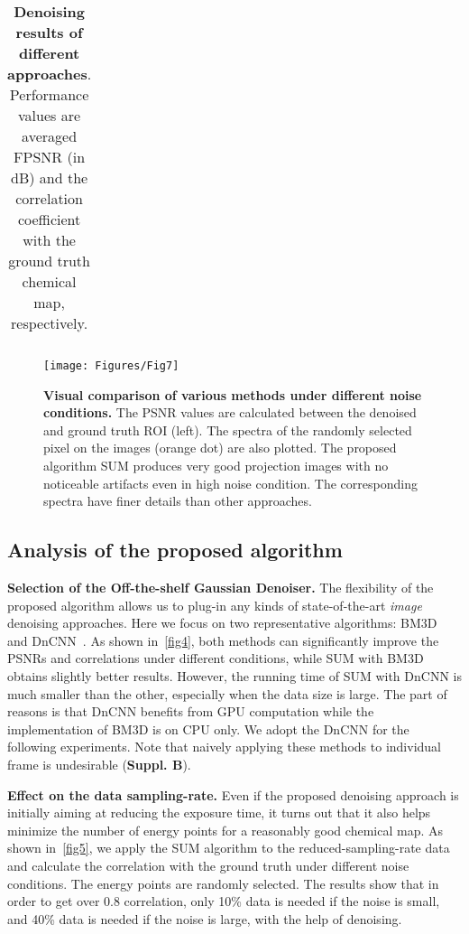 \documentclass[10pt,twocolumn,letterpaper]{article}
\begin{document}
\begin{table*}[ht]
{\begin{tabular}{cccccccccc}
        
        \bottomrule
    \end{tabular}
    }
    \vspace{-5pt}
    \caption{\textbf{Denoising results of different approaches}. Performance values are averaged FPSNR (in dB) and the correlation coefficient with the ground truth chemical map, respectively. }
    \label{tab:test_data}
    \vspace{-5pt}
\end{table*}


\begin{figure*}
  \centering
    \texttt{[image: Figures/Fig7]}
    \vspace{-15pt}
    \caption{\textbf{Visual comparison of various methods under different noise conditions.} The PSNR values are calculated between the denoised and ground truth ROI (left). The spectra of the randomly selected pixel on the images (orange dot) are also plotted. The proposed algorithm SUM produces very good projection images with no noticeable artifacts even in high noise condition. The corresponding spectra have finer details than other approaches.}
    \label{fig7}
    \vspace{-10pt}
\end{figure*} 
\subsection{Analysis of the proposed algorithm}
\label{analysis}
\textbf{Selection of the Off-the-shelf Gaussian Denoiser.} The flexibility of the proposed algorithm allows us to plug-in any kinds of state-of-the-art \textit{image} denoising approaches. Here we focus on two representative algorithms: BM3D~\cite{dabov2007image} and DnCNN~\cite{zhang2017beyond}. As shown in~\cref{fig4}, both methods can significantly improve the PSNRs and correlations under different conditions, while SUM with BM3D obtains slightly better results. However, the running time of SUM with DnCNN is much smaller than the other, especially when the data size is large. The part of reasons is that DnCNN benefits from GPU computation while the implementation of BM3D is on CPU only. We adopt the DnCNN for the following experiments. Note that naively applying these methods to individual frame is undesirable (\textbf{Suppl. B}).

\textbf{Effect on the data sampling-rate.} Even if the proposed denoising approach is initially aiming at reducing the exposure time, it turns out that it also helps minimize the number of energy points for a reasonably good chemical map. As shown in~\cref{fig5}, we apply the SUM algorithm to the reduced-sampling-rate data and calculate the correlation with the ground truth under different noise conditions. The energy points are randomly selected. The results show that in order to get over 0.8 correlation, only 10\% data is needed if the noise is small, and 40\% data is needed if the noise is large, with the help of denoising.
\end{document}
